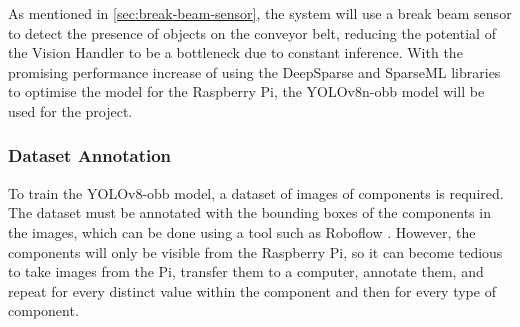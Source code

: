 As mentioned in \autoref{sec:break-beam-sensor}, the system will use a break beam sensor to detect the presence of objects on the conveyor belt, reducing the potential of the Vision Handler to be a bottleneck due to constant inference. With the promising performance increase of using the DeepSparse \cite{deepsparse} and SparseML \cite{sparseml} libraries to optimise the model for the Raspberry Pi, the YOLOv8n-obb model will be used for the project.




\subsubsection{Dataset Annotation}

To train the YOLOv8-obb model, a dataset of images of components is required. The dataset must be annotated with the bounding boxes of the components in the images, which can be done using a tool such as Roboflow \cite{roboflow}. However, the components will only be visible from the Raspberry Pi, so it can become tedious to take images from the Pi, transfer them to a computer, annotate them, and repeat for every distinct value within the component and then for every type of component.

